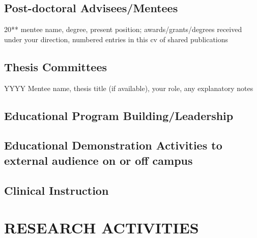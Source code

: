 \documentclass[11pt]{article}
\newenvironment{lyxlist}[1]
	{\begin{list}{}
		{\setlength\itemsep{-0.5ex}
		\settowidth{\labelwidth}{#1}
		 \setlength{\leftmargin}{\labelwidth}
		 \addtolength{\leftmargin}{\labelsep}
		 \renewcommand{\makelabel}[1]{##1\hfil}}}
	{\end{list}}
\begin{document}
\subsection*{Post-doctoral Advisees/Mentees}
\begin{lyxlist}{20{*}{*}\textendash 20{*}{*}}
\item[{20{*}{*}\textendash 20{*}{*}}]mentee name, degree, present position; awards/grants/degrees received under your direction, numbered entries in this cv of shared publications
\end{lyxlist}

\subsection*{Thesis Committees}
\begin{lyxlist}{20{*}{*}\textendash 20{*}{*}} %
\item[{YYYY}]Mentee name, thesis title (if available), your role, any explanatory notes
\end{lyxlist}

\subsection*{Educational Program Building/Leadership \ {}} 

\subsection*{Educational Demonstration Activities to external audience on or off campus \ {}} 

\subsection*{Clinical Instruction \ {}} 

\section*{RESEARCH ACTIVITIES}
\end{document}
